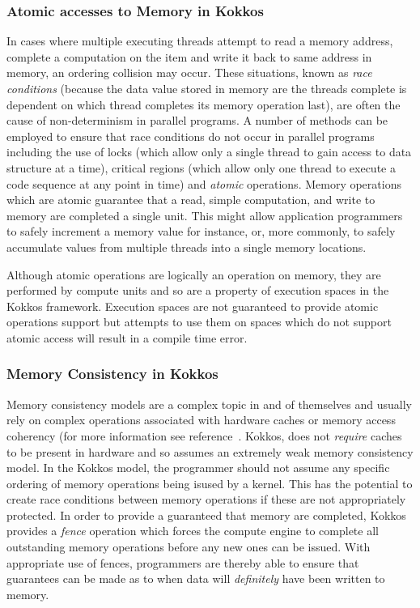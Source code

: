 \subsubsection{Atomic accesses to Memory in Kokkos}

In cases where multiple executing threads attempt to read
a memory address, complete a computation on the item and
write it back to same address in memory, an ordering
collision may occur. These situations, known as
{\em race conditions} (because the data value
stored in memory are the threads complete is dependent
on which thread completes its memory operation last),
are often the cause of non-determinism in parallel
programs. A number of methods can be employed to ensure
that race conditions do not occur in parallel programs
including the use of locks (which allow only a single
thread to gain access to data structure at a time),
critical regions (which allow only one thread to execute
a code sequence at any point in time) and {\em atomic}
operations. Memory operations which are atomic guarantee
that a read, simple computation, and write to memory
are completed a single unit. This might allow application
programmers to safely increment a memory value for instance,
or, more commonly, to safely accumulate values from multiple
threads into a single memory locations.

Although atomic operations are logically an operation
on memory, they are performed by compute units and so
are a property of execution spaces in the Kokkos framework.
Execution spaces are not guaranteed to provide atomic
operations support but attempts to use them on spaces
which do not support atomic access will result in 
a compile time error.


\subsubsection{Memory Consistency in Kokkos}

Memory consistency models are a complex topic in and of themselves
and usually rely on complex operations associated with hardware
caches or memory access coherency (for more information 
see reference~\cite{handp_hardware}. 
Kokkos, does not {\em require} caches to be present
in hardware and so assumes an extremely weak memory consistency
model. In the Kokkos model, the programmer should not assume any
specific ordering of memory operations being isused by a
kernel. This has the potential to create race conditions between
memory operations if these are not appropriately protected. In
order to provide a guaranteed that memory are completed, Kokkos
provides a {\em fence} operation which forces the compute 
engine to complete all outstanding memory operations before
any new ones can be issued. With appropriate use of fences,
programmers are thereby able to ensure that guarantees can
be made as to when data will {\em definitely} have been 
written to memory.



